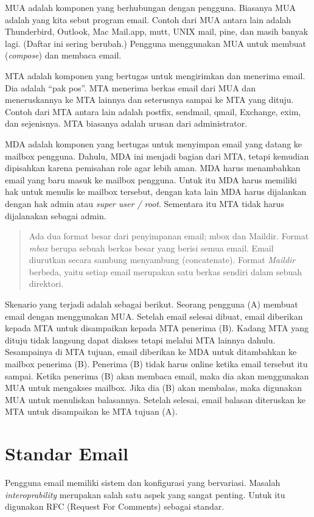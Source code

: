 MUA adalah komponen yang berhubungan dengan pengguna. Biasanya MUA adalah yang
kita sebut program email. Contoh dari MUA antara lain adalah Thunderbird,
Outlook, Mac Mail.app, mutt, UNIX mail, pine, dan masih banyak lagi. (Daftar
ini sering berubah.)
Pengguna menggunakan MUA untuk membuat ({\em compose}) dan membaca email.

MTA adalah komponen yang bertugas untuk mengirimkan dan menerima email. Dia
adalah ``pak pos''. MTA menerima berkas email dari MUA dan meneruskannya ke MTA
lainnya dan seterusnya sampai ke MTA yang dituju. Contoh dari MTA antara lain
adalah postfix, sendmail, qmail, Exchange, exim, dan sejenisnya. MTA biasanya
adalah urusan dari administrator.

MDA adalah komponen yang bertugas untuk menyimpan email yang datang ke mailbox
pengguna. Dahulu, MDA ini menjadi bagian dari MTA, tetapi kemudian dipisahkan
karena pemisahan role agar lebih aman. MDA harus menambahkan email yang baru
masuk ke mailbox pengguna. Untuk itu MDA harus memiliki hak untuk menulis ke
mailbox tersebut, dengan kata lain MDA harus dijalankan dengan hak admin atau
{\em super user / root}. Sementara itu MTA tidak harus dijalanakan sebagai admin.

\begin{mdframed}
   \begin{quote}
   Ada dua format besar dari penyimpanan email; mbox dan Maildir. Format {\em
   mbox} berupa sebuah berkas besar yang berisi semua email. Email diurutkan
   secara sambung menyambung (concatenate). Format {\em Maildir} berbeda, yaitu
   setiap email merupakan satu berkas sendiri dalam sebuah direktori.
   \end{quote}
\end{mdframed}

Skenario yang terjadi adalah sebagai berikut. Seorang pengguna (A) membuat
email dengan menggunakan MUA. Setelah email selesai dibuat, email diberikan
kepada MTA untuk disampaikan kepada MTA penerima (B). Kadang MTA yang dituju
tidak langsung dapat diakses tetapi melalui MTA lainnya dahulu.  Sesampainya di
MTA tujuan, email diberikan ke MDA untuk ditambahkan ke mailbox penerima (B).
Penerima (B) tidak harus online ketika email tersebut itu sampai. Ketika
penerima (B) akan membaca email, maka dia akan menggunakan MUA untuk mengakses
mailbox. Jika dia (B) akan membalas, maka digunakan MUA untuk menuliskan
balasannya. Setelah selesai, email balasan diteruskan ke MTA untuk disampaikan
ke MTA tujuan (A).


\section{Standar Email}
Pengguna email memiliki sistem dan konfigurasi yang bervariasi. Masalah
{\em interoprability} merupakan salah satu aspek yang sangat penting. Untuk itu
digunakan RFC (Request For Comments) sebagai standar.

